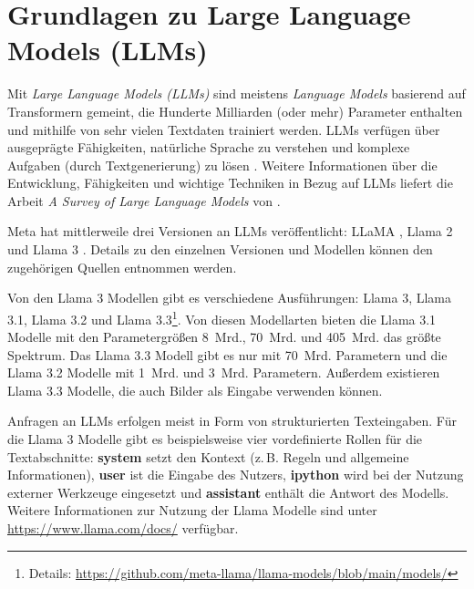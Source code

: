\section*{Grundlagen zu Large Language Models (LLMs)}
Mit \textit{Large Language Models (LLMs)} sind meistens \textit{Language Models} basierend auf Transformern gemeint, die Hunderte Milliarden (oder mehr) Parameter enthalten und mithilfe von sehr vielen Textdaten trainiert werden.
LLMs verfügen über ausgeprägte Fähigkeiten, natürliche Sprache zu verstehen und komplexe Aufgaben (durch Textgenerierung) zu lösen \citep{zhaoSurveyLargeLanguage2024}.
Weitere Informationen über die Entwicklung, Fähigkeiten und wichtige Techniken in Bezug auf LLMs liefert die Arbeit \textit{A Survey of Large Language Models} von \citet{zhaoSurveyLargeLanguage2024}.


Meta hat mittlerweile drei Versionen an LLMs veröffentlicht: LLaMA \citep{touvronLLaMAOpenEfficient2023}, Llama 2 \citep{touvronLlama2Open2023} und Llama 3 \citep{ai@metaLlama3Herd2024}. Details zu den einzelnen Versionen und Modellen können den zugehörigen Quellen entnommen werden.

Von den Llama 3 Modellen gibt es verschiedene Ausführungen: Llama 3, Llama 3.1, Llama 3.2 und Llama 3.3\footnote{Details: \url{https://github.com/meta-llama/llama-models/blob/main/models/}}.
Von diesen Modellarten bieten die Llama 3.1 Modelle mit den Parametergrößen 8~Mrd., 70~Mrd. und 405~Mrd. das größte Spektrum.
Das Llama 3.3 Modell gibt es nur mit 70~Mrd. Parametern und die Llama 3.2 Modelle mit 1~Mrd. und 3~Mrd. Parametern.
Außerdem existieren Llama 3.3 Modelle, die auch Bilder als Eingabe verwenden können.

Anfragen an LLMs erfolgen meist in Form von strukturierten Texteingaben.
Für die Llama 3 Modelle gibt es beispielsweise vier vordefinierte Rollen für die Textabschnitte: \textbf{system} setzt den Kontext (z.\,B. Regeln und allgemeine Informationen), \textbf{user} ist die Eingabe des Nutzers, \textbf{ipython} wird bei der Nutzung externer Werkzeuge eingesetzt und \textbf{assistant} enthält die Antwort des Modells.
Weitere Informationen zur Nutzung der Llama Modelle sind unter \url{https://www.llama.com/docs/} verfügbar.

